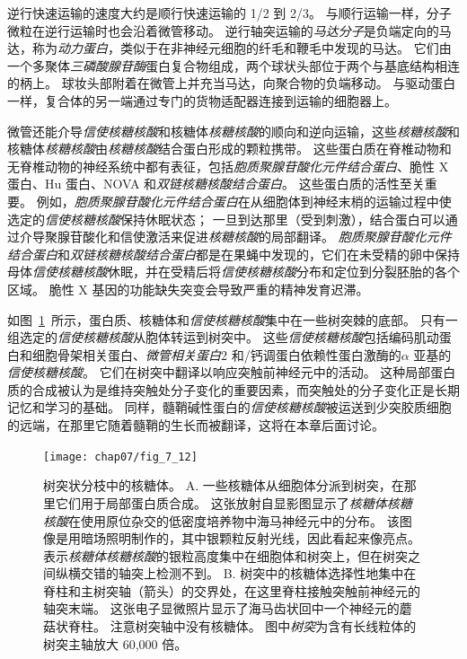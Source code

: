 逆行快速运输的速度大约是顺行快速运输的 1/2 到 2/3。
与顺行运输一样，分子微粒在逆行运输时也会沿着微管移动。
逆行轴突运输的\textit{马达分子}是负端定向的马达，称为\textit{动力蛋白}，类似于在非神经元细胞的纤毛和鞭毛中发现的马达。
它们由一个多聚体\textit{三磷酸腺苷酶}蛋白复合物组成，两个球状头部位于两个与基底结构相连的柄上。
球妆头部附着在微管上并充当马达，向聚合物的负端移动。
与驱动蛋白一样，复合体的另一端通过专门的货物适配器连接到运输的细胞器上。


微管还能介导\textit{信使核糖核酸}和核糖体\textit{核糖核酸}的顺向和逆向运输，这些\textit{核糖核酸}和核糖体\textit{核糖核酸}由\textit{核糖核酸}结合蛋白形成的颗粒携带。
这些蛋白质在脊椎动物和无脊椎动物的神经系统中都有表征，包括\textit{胞质聚腺苷酸化元件结合蛋白}、脆性 X 蛋白、Hu 蛋白、NOVA 和\textit{双链核糖核酸结合蛋白}。
这些蛋白质的活性至关重要。
例如，\textit{胞质聚腺苷酸化元件结合蛋白}在从细胞体到神经末梢的运输过程中使选定的\textit{信使核糖核酸}保持休眠状态；
一旦到达那里（受到刺激），结合蛋白可以通过介导聚腺苷酸化和信使激活来促进\textit{核糖核酸}的局部翻译。
\textit{胞质聚腺苷酸化元件结合蛋白}和\textit{双链核糖核酸结合蛋白}都是在果蝇中发现的，它们在未受精的卵中保持母体\textit{信使核糖核酸}休眠，并在受精后将\textit{信使核糖核酸}分布和定位到分裂胚胎的各个区域。
脆性 X 基因的功能缺失突变会导致严重的精神发育迟滞。


如图~\ref{fig:7_12}~所示，蛋白质、核糖体和\textit{信使核糖核酸}集中在一些树突棘的底部。
只有一组选定的\textit{信使核糖核酸}从胞体转运到树突中。
这些\textit{信使核糖核酸}包括编码肌动蛋白和细胞骨架相关蛋白、\textit{微管相关蛋白}2 和/钙调蛋白依赖性蛋白激酶的$\alpha$ 亚基的\textit{信使核糖核酸}。
它们在树突中翻译以响应突触前神经元中的活动。
这种局部蛋白质的合成被认为是维持突触处分子变化的重要因素，而突触处的分子变化正是长期记忆和学习的基础。
同样，髓鞘碱性蛋白的\textit{信使核糖核酸}被运送到少突胶质细胞的远端，在那里它随着髓鞘的生长而被翻译，这将在本章后面讨论。


\begin{figure}[htbp]
	\centering
	\texttt{[image: chap07/fig\_7\_12]}
	\caption{树突状分枝中的核糖体。
		A. 一些核糖体从细胞体分派到树突，在那里它们用于局部蛋白质合成。
		这张放射自显影图显示了\textit{核糖体核糖核酸}在使用原位杂交的低密度培养物中海马神经元中的分布。
		该图像是用暗场照明制作的，其中银颗粒反射光线，因此看起来像亮点。
		表示\textit{核糖体核糖核酸}的银粒高度集中在细胞体和树突上，但在树突之间纵横交错的轴突上检测不到。
		B. 树突中的核糖体选择性地集中在脊柱和主树突轴（箭头）的交界处，在这里脊柱接触突触前神经元的轴突末端。
		这张电子显微照片显示了海马齿状回中一个神经元的蘑菇状脊柱。
		注意树突轴中没有核糖体。
		图中\textit{树突}为含有长线粒体的树突主轴放大 60,000 倍。}
	\label{fig:7_12}
\end{figure}



